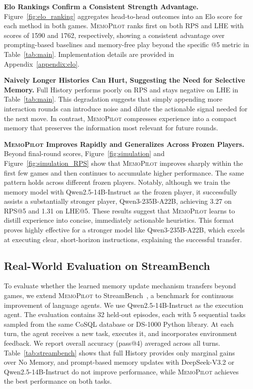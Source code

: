 \documentclass{article}
\newcommand{\methodname}{MemoPilot}
\newcommand{\method}{\textsc{\methodname}}
\theoremstyle{plain}
\theoremstyle{definition}
\theoremstyle{remark}
\begin{document}
 \textbf{Elo Rankings Confirm a Consistent Strength Advantage.}
 Figure~\ref{fig:elo_ranking} aggregates head-to-head outcomes into an Elo score for each method in both games. \method{} ranks first on both RPS and LHE with scores of 1590 and 1762, respectively, showing a consistent advantage over prompting-based baselines and memory-free play beyond the specific @5 metric in Table~\ref{tab:main}. Implementation details are provided in Appendix~\ref{appendix:elo}.

\textbf{Naively Longer Histories Can Hurt, Suggesting the Need for Selective Memory.}
Full History performs poorly on RPS and stays negative on LHE in Table~\ref{tab:main}. This degradation suggests that simply appending more interaction rounds can introduce noise and dilute the actionable signal needed for the next move. In contrast, \method{} compresses experience into a compact memory that preserves the information most relevant for future rounds.

\textbf{\method{} Improves Rapidly and Generalizes Across Frozen Players.}
Beyond final-round scores, Figure~\ref{fig:simulation} and Figure~\ref{fig:simulation_RPS} show that \method{} improves sharply within the first few games and then continues to accumulate higher performance. The same pattern holds across different frozen players. Notably, although we train the memory model with Qwen2.5-14B-Instruct as the frozen player, it successfully assists a substantially stronger player, Qwen3-235B-A22B, achieving 3.27 on RPS@5 and 1.31 on LHE@5. These results suggest that \method{} learns to distill experience into concise, immediately actionable heuristics. This format proves highly effective for a stronger model like Qwen3-235B-A22B, which excels at executing clear, short-horizon instructions, explaining the successful transfer.

\subsection{Real-World Evaluation on StreamBench}

To evaluate whether the learned memory update mechanism transfers beyond games, we extend \method{} to StreamBench~\citep{wu2024streambench}, a benchmark for continuous improvement of language agents. We use Qwen2.5-14B-Instruct as the execution agent. The evaluation contains 32 held-out episodes, each with 5 sequential tasks sampled from the same CoSQL database or DS-1000 Python library. At each turn, the agent receives a new task, executes it, and incorporates environment feedback. We report overall accuracy (pass@4) averaged across all turns. Table~\ref{tab:streambench} shows that full History provides only marginal gains over No Memory, and prompt-based memory updates with DeepSeek-V3.2 or Qwen2.5-14B-Instruct do not improve performance, while \method{} achieves the best performance on both tasks.
\end{document}
